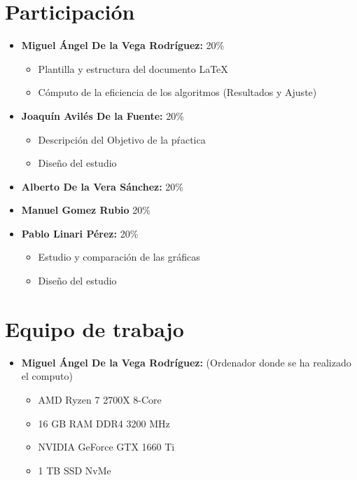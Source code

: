 \documentclass[11pt]{article}
\begin{document}
                                                

\tableofcontents %

\newpage %

\section{Participación}
\begin{itemize}
    \item \textbf{Miguel Ángel De la Vega Rodríguez:} 20\%
    \begin{itemize}
        \item Plantilla y estructura del documento \LaTeX
        \item Cómputo de la eficiencia de los algoritmos (Resultados y Ajuste)
    \end{itemize}
    \item \textbf{Joaquín Avilés De la Fuente:} 20\%
    \begin{itemize}
        \item Descripción del Objetivo de la pŕactica
        \item Diseño del estudio
    \end{itemize}
    \item \textbf{Alberto De la Vera Sánchez: } 20\%
    \item \textbf{Manuel Gomez Rubio} 20\%
    \item \textbf{Pablo Linari Pérez:} 20\%
    \begin{itemize}
        \item Estudio y comparación de las gráficas
        \item Diseño del estudio
    \end{itemize}
\end{itemize}

\section{Equipo de trabajo}

\begin{itemize}
    \item \textbf{Miguel Ángel De la Vega Rodríguez:} (Ordenador donde se ha realizado el computo)
        \begin{itemize}
            \item AMD Ryzen 7 2700X 8-Core
            \item 16 GB RAM DDR4 3200 MHz
            \item NVIDIA GeForce GTX 1660 Ti 
            \item 1 TB SSD NvMe 
        \end{itemize}
\end{itemize}
\end{document}
